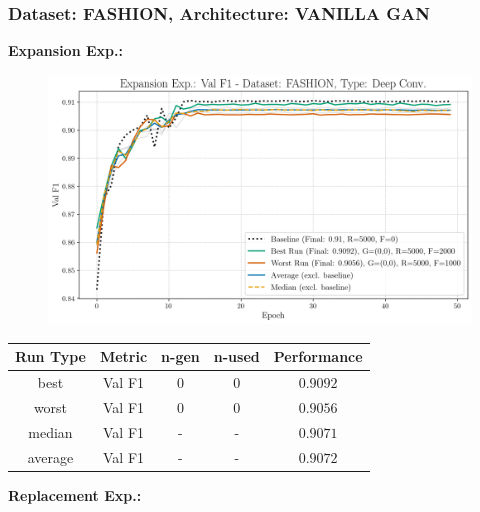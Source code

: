 \subsubsection{Dataset: FASHION, Architecture: VANILLA GAN}
\noindent\textbf{Expansion Exp.:}
\begin{figure}[htbp]
	\centering
	\includegraphics[width=.85\textwidth]{abb/strat_classifier_performance/FASHION_STRATIFIED_CLASSIFIERS_VANILLA_GAN/expansion_experiments/val_f1_score_['VANILLA']_FASHION_all.png}
	\label{fig:app_strat_class_performance_expansion_exp._val_f1_score_}
\end{figure}
\begin{table}[H]
	\centering
	\vspace{-1em}
	\begin{tabular}{|c|c|c|c|c|}
		\hline
		Run Type & Metric & n-gen & n-used & Performance \\ \hline
		best & Val F1 & 0 & 0 & $0.9092$\\ \hline
		worst & Val F1 & 0 & 0 & $0.9056$\\ \hline
		median & Val F1 & - & - & $0.9071$\\ \hline
		average & Val F1 & - & - & $0.9072$
		\\ \hline
	\end{tabular}
\end{table}
\noindent\textbf{Replacement Exp.:}
